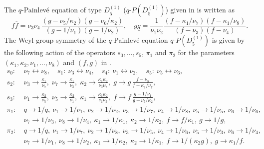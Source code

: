 \documentclass[12pt]{amsart}
\numberwithin{equation}{section}
\theoremstyle{definition}
\begin{document}
\subsection{}
The $q$-Painlev\'e equation of type $D^{(1)}_5 $ ($q$-$P(D^{(1)}_5)$) given in \cite{KNY} is written as
\begin{equation}
f\overline{f} = \nu_3\nu_4\, \frac{ ( g - \nu_5 /\kappa_2 ) ( g - \nu_6/\kappa_2 )}{ ( g - 1/\nu_1 ) ( g - 1/\nu_2) }, \quad
g\underline{g} = \frac{1}{\nu_1\nu_2}\frac{( f - \kappa_1 /\nu_7 ) ( f - \kappa_1/\nu_8 )}{(f - \nu_3)(f - \nu_4)}. \label{eq:qPD15}
\end{equation}
The Weyl group symmetry of the $q$-Painlev\'e equation $q$-$P(D^{(1)}_5 )$ is given by the following action of the operators $s_0, \dots ,s_5$, $\pi _1$ and $\pi _2$ for the parameters $(\kappa_{1}, \kappa_{2}, \nu_{1}, \dots , \nu_{8}) $ and $(f, g) $ in \cite{KNY}.
\begin{align}
s_0 : & \: \nu_7 \leftrightarrow \nu_8 , \quad s_1 : \: \nu_3 \leftrightarrow \nu_4 , \quad  s_4 : \: \nu_1 \leftrightarrow \nu_2 , \quad  s_5 : \: \nu_5 \leftrightarrow \nu_6 , \label{eq:AffineWeylActionD5} \\
s_2 : & \: \nu_3 \rightarrow\frac{\kappa_1}{\nu_7}, \; 
 \nu_7 \rightarrow \frac{\kappa_1}{\nu_3}, \;
 \kappa_2 \rightarrow \frac{\kappa_1\kappa_2}{\nu_3\nu_7}, \;
 g \rightarrow g\, \frac{f - \nu_3}{f - \kappa_1 /\nu_7} , \nonumber \\
s_3 : & \: \nu_1 \rightarrow\frac{\kappa_2}{\nu_5}, \;
 \nu_5 \rightarrow \frac{\kappa_2}{\nu_1}, \;
 \kappa_1 \rightarrow \frac{\kappa_1\kappa_2}{\nu_1\nu_5}, \;
 f \rightarrow f\, \frac{g - 1/\nu_1}{g - \nu_5/\kappa_2} , \nonumber \\
  \pi _1 : & \: q \rightarrow 1/q, \: \nu_1 \rightarrow 1/\nu_1, \:  \nu_2 \rightarrow 1/\nu_2,  \: \nu_3 \rightarrow 1/\nu_7,  \: \nu_4 \rightarrow 1/\nu_8, \: \nu_5 \rightarrow 1/\nu_5, \: \nu_6 \rightarrow 1/\nu_6, \nonumber \\
& \: \nu_7 \rightarrow 1/\nu_3, \: \nu_8 \rightarrow 1/\nu_4, \: \kappa_1 \rightarrow 1/\kappa_1 , \: \kappa_2 \rightarrow 1/\kappa_2 , \: f \rightarrow f/\kappa_1 , \: g \rightarrow 1/g , \nonumber \\
  \pi _2 : & \: q \rightarrow 1/q, \: \nu_1 \rightarrow 1/\nu_7, \:  \nu_2 \rightarrow 1/\nu_8,  \: \nu_3 \rightarrow 1/\nu_5,  \: \nu_4 \rightarrow 1/\nu_6, \: \nu_5 \rightarrow 1/\nu_3, \: \nu_6 \rightarrow 1/\nu_4, \nonumber \\
& \: \nu_7 \rightarrow 1/\nu_1, \: \nu_8 \rightarrow 1/\nu_2, \: \kappa_1 \rightarrow 1/\kappa_2 , \: \kappa_2 \rightarrow 1/\kappa_1 , \: f \rightarrow 1/(\kappa_2 g) , \: g \rightarrow \kappa_1/f . \nonumber 
\end{align}
\end{document}
